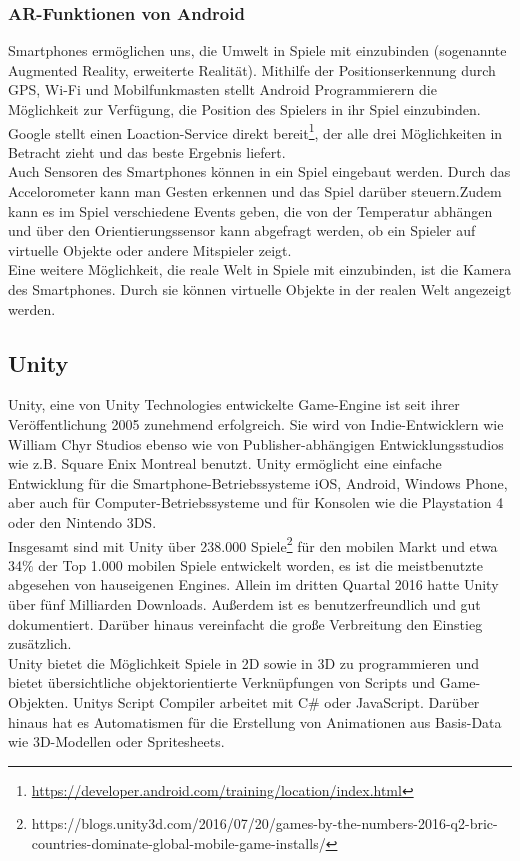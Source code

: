 \documentclass[extern,palatino]{cgBA}
\begin{document}
\subsubsection{AR-Funktionen von Android}
Smartphones ermöglichen uns, die Umwelt in Spiele mit einzubinden (sogenannte Augmented Reality, erweiterte Realität). Mithilfe der Positionserkennung durch GPS, Wi-Fi und Mobilfunkmasten stellt Android Programmierern die Möglichkeit zur Verfügung, die Position des Spielers in ihr Spiel einzubinden. Google stellt einen Loaction-Service direkt bereit\footnote{\url{https://developer.android.com/training/location/index.html}}, der alle drei Möglichkeiten in Betracht zieht und das beste Ergebnis liefert.\\
Auch Sensoren des Smartphones können in ein Spiel eingebaut werden. Durch das Accelorometer kann man Gesten erkennen und das Spiel darüber steuern.Zudem kann es im Spiel verschiedene Events geben, die von der Temperatur abhängen und über den Orientierungssensor kann abgefragt werden, ob ein Spieler auf virtuelle Objekte oder andere Mitspieler zeigt.\\
Eine weitere Möglichkeit, die reale Welt in Spiele mit einzubinden, ist die Kamera des Smartphones. Durch sie können virtuelle Objekte in der realen Welt angezeigt werden. 
\newpage
\subsection{Unity}
Unity, eine von Unity Technologies entwickelte Game-Engine ist seit ihrer Veröffentlichung 2005 zunehmend erfolgreich. %
	Sie wird von Indie-Entwicklern wie William Chyr Studios ebenso wie von Publisher-abhängigen Entwicklungsstudios wie z.B. Square Enix Montreal benutzt. Unity ermöglicht eine einfache Entwicklung für die Smartphone-Betriebssysteme iOS, Android, Windows Phone, aber auch für Computer-Betriebssysteme und für Konsolen wie die Playstation 4 oder den Nintendo 3DS.
	\\Insgesamt sind mit Unity über 238.000 Spiele\footnote{https://blogs.unity3d.com/2016/07/20/games-by-the-numbers-2016-q2-bric-countries-dominate-global-mobile-game-installs/} für den mobilen Markt 
	und etwa 34\% der Top 1.000 mobilen Spiele entwickelt worden, es ist die meistbenutzte abgesehen von hauseigenen Engines. Allein im dritten Quartal 2016 hatte Unity über fünf Milliarden Downloads. Außerdem ist es benutzerfreundlich und gut dokumentiert. Darüber hinaus vereinfacht die große Verbreitung den Einstieg zusätzlich.
	\\Unity bietet die Möglichkeit Spiele in 2D sowie in 3D zu programmieren und bietet übersichtliche objektorientierte Verknüpfungen von Scripts und Game-Objekten. Unitys Script Compiler arbeitet mit C\# oder JavaScript. Darüber hinaus hat es Automatismen für die Erstellung von Animationen aus Basis-Data wie 3D-Modellen oder Spritesheets. %
	\newpage 
\end{document}
